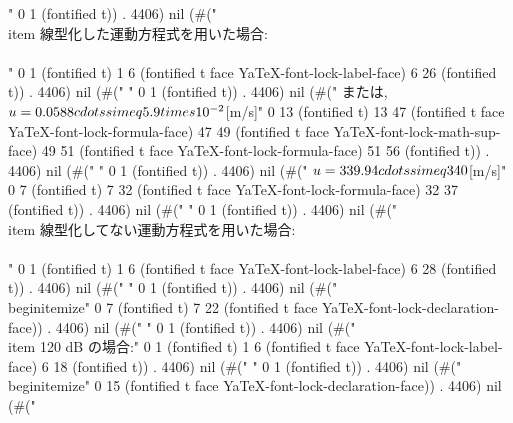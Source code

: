 " 0 1 (fontified t)) . 4406) nil (#("	\\item 線型化した運動方程式を用いた場合:\\\\" 0 1 (fontified t) 1 6 (fontified t face YaTeX-font-lock-label-face) 6 26 (fontified t)) . 4406) nil (#("
" 0 1 (fontified t)) . 4406) nil (#("	      または,  $u=0.0588\\cdots\\simeq5.9\\times10^{-2}$[m/s]" 0 13 (fontified t) 13 47 (fontified t face YaTeX-font-lock-formula-face) 47 49 (fontified t face YaTeX-font-lock-math-sup-face) 49 51 (fontified t face YaTeX-font-lock-formula-face) 51 56 (fontified t)) . 4406) nil (#("
" 0 1 (fontified t)) . 4406) nil (#("	      $u=339.94\\cdots\\simeq340$[m/s]" 0 7 (fontified t) 7 32 (fontified t face YaTeX-font-lock-formula-face) 32 37 (fontified t)) . 4406) nil (#("
" 0 1 (fontified t)) . 4406) nil (#("	\\item 線型化してない運動方程式を用いた場合:\\\\" 0 1 (fontified t) 1 6 (fontified t face YaTeX-font-lock-label-face) 6 28 (fontified t)) . 4406) nil (#("
" 0 1 (fontified t)) . 4406) nil (#("       \\begin{itemize}" 0 7 (fontified t) 7 22 (fontified t face YaTeX-font-lock-declaration-face)) . 4406) nil (#("
" 0 1 (fontified t)) . 4406) nil (#(" \\item 120 dB の場合:" 0 1 (fontified t) 1 6 (fontified t face YaTeX-font-lock-label-face) 6 18 (fontified t)) . 4406) nil (#("
" 0 1 (fontified t)) . 4406) nil (#("\\begin{itemize}" 0 15 (fontified t face YaTeX-font-lock-declaration-face)) . 4406) nil (#("
